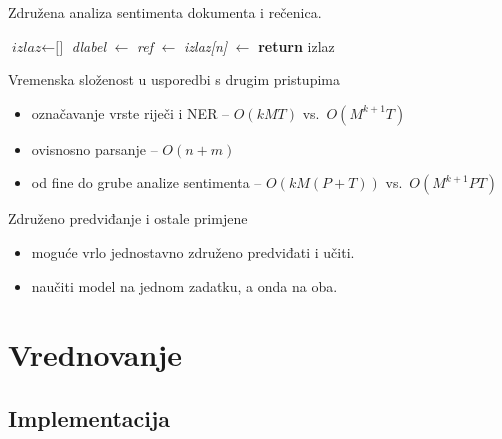 \documentclass{beamer}
\begin{document}
\begin{frame}{Združena analiza sentimenta dokumenta i rečenica.}
  \begin{algorithm}[H]
  \begin{algorithmic}[1]
  \State $\textit{izlaz} \gets \text{[]}$
  \State \textit{dlabel} $\gets$ 
  \State {} 
    \State \textit{ref} $\gets$ 
    \State \textit{izlaz[n]} $\gets$ 
  \EndFor
  \State {}
  \State \textbf{return} izlaz
  \EndFunction
  \end{algorithmic}
  \end{algorithm}
\end{frame}

\begin{frame}{Vremenska složenost u usporedbi s drugim pristupima}
  \begin{itemize}
    \item označavanje vrste riječi i NER -- $O(k M T)$ vs.~$O(M^{k+1} T)$
    \item ovisnosno parsanje -- $O(n + m)$
    \item od fine do grube analize sentimenta -- $O(k M (P + T))$ vs.~$O(M^{k+1} P T)$
  \end{itemize}
\end{frame}

\begin{frame}{Združeno predviđanje i ostale primjene}
  \begin{itemize}
    \item moguće vrlo jednostavno združeno predviđati i učiti.
    \item naučiti model na jednom zadatku, a onda na oba.
  \end{itemize}
\end{frame}

\section{Vrednovanje}

\subsection{Implementacija}
\end{document}
